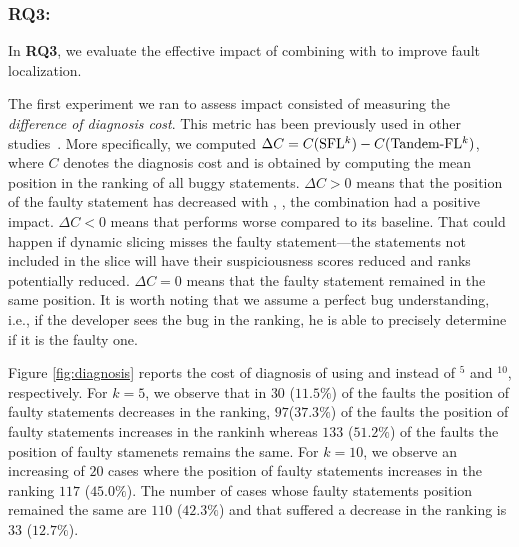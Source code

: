 \documentclass{article}
\begin{document}
\subsubsection{RQ3: \textit{\rqthree}}

In \textbf{RQ3}, we evaluate the effective impact of combining \ds{}
with \sfl{} to improve fault localization.

The first experiment we ran to assess impact consisted of measuring
the \emph{difference of diagnosis cost}. This metric has been
previously used in other studies~. More specifically,
we computed $\Delta{}C = C(\textrm{SFL$^{k}$}) -
C(\textrm{Tandem-FL$^{k}$})$, where $C$ denotes the diagnosis cost and is
obtained by computing the mean position in the ranking of all buggy
statements. $\Delta C >0$ means that the position of the faulty
statement has decreased with , \ie{}, the combination had a
positive impact. $\Delta C <0$ means that  performs worse
compared to its baseline. That could happen if dynamic slicing misses
the faulty statement---the statements not included in the slice will
have their suspiciousness scores reduced and ranks potentially
reduced. $\Delta C=0$ means that the faulty statement remained in the
same position.  It is worth noting that we assume a perfect bug
understanding, i.e., if the developer sees the bug in the ranking, he
is able to precisely determine if it is the faulty one.




Figure \ref{fig:diagnosis} reports the cost of diagnosis of using  and  instead of \sfl{}$^{5}$ and \sfl{}$^{10}$,
respectively. For $k=5$, we observe that in $30$ ($11.5\%$) of the faults
the position of faulty statements decreases
in the ranking, $97$($37.3\%$) of the faults the position of faulty statements increases in the rankinh whereas $133$ ($51.2\%$) of the faults the position of faulty stamenets remains the same. For $k=10$, we observe an increasing of $20$ cases where the position of faulty statements increases in the ranking $117$ ($45.0\%$).
The number of cases whose faulty statements position remained the same are $110$ ($42.3\%$) and that suffered a decrease in the ranking is $33$ ($12.7\%$).
\end{document}
